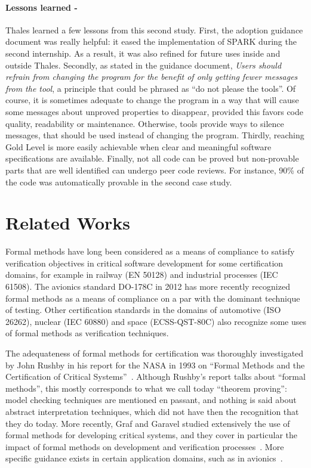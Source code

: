 \documentclass{llncs}
\begin{document}
\paragraph{Lessons learned -}
Thales learned a few lessons from this second study. First, the adoption
guidance document was really helpful: it eased the implementation of SPARK
during the second internship. As a result, it was also refined for future uses
inside and outside Thales. Secondly, as stated in the guidance document,
\textit{Users should refrain from changing the program for the benefit of only
  getting fewer messages from the tool}, a principle that could be phrased as
``do not please the tools''. Of course, it is sometimes adequate to change the
program in a way that will cause some messages about unproved properties to
disappear, provided this favors code quality, readability or
maintenance. Otherwise, tools provide ways to silence messages, that should be
used instead of changing the program.  Thirdly, reaching Gold Level is more
easily achievable when clear and meaningful software specifications are
available. Finally, not all code can be proved but non-provable parts that are
well identified can undergo peer code reviews. For instance, 90\% of the code
was automatically provable in the second case study.

\section{Related Works}
\label{sec:related-works}

Formal methods have long been considered as a means of compliance to satisfy
verification objectives in critical software development for some certification
domains, for example in railway (EN 50128) and industrial processes (IEC
61508). The avionics standard DO-178C in 2012 has more recently recognized
formal methods as a means of compliance on a par with the dominant technique of
testing. Other certification standards in the domains of automotive (ISO
26262), nuclear (IEC 60880) and space (ECSS-QST-80C) also recognize some uses
of formal methods as verification techniques.

The adequateness of formal methods for certification was thoroughly
investigated by John Rushby in his report for the NASA in 1993 on ``Formal
Methods and the Certification of Critical
Systems''~\cite{Rushby93formalmethods}. Although Rushby's report talks about
``formal methods'', this mostly corresponds to what we call today ``theorem
proving'': model checking techniques are mentioned en passant, and nothing is
said about abstract interpretation techniques, which did not have then the
recognition that they do today. More recently, Graf and Garavel studied
extensively the use of formal methods for developing critical systems, and they
cover in particular the impact of formal methods on development and
verification processes~\cite{GrafGaravel-BSI-2013}. More specific guidance
exists in certain application domains, such as in
avionics~\cite{BrownERTS2010}.
\end{document}
